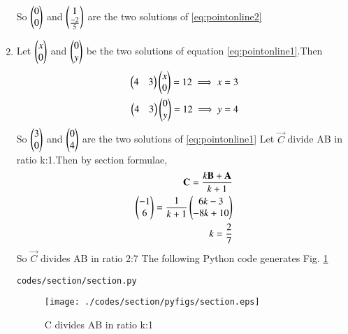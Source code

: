 \begin{enumerate}[label=\thesection.\arabic*.,ref=\thesection.\theenumi]
So $\begin{pmatrix}0\\0\end{pmatrix}$ and $\begin{pmatrix}1\\\frac{-2}{5}\end{pmatrix}$ are the two solutions of \ref{eq:pointonline2}
\item 
Let $\begin{pmatrix}x\\0\end{pmatrix}$ and $\begin{pmatrix}0\\y\end{pmatrix}$ be the two solutions of equation \ref{eq:pointonline1}.Then
\begin{align}
 \begin{pmatrix}4&3\end{pmatrix}\begin{pmatrix}x\\0\end{pmatrix}=12
 \implies x=3
 \\
 \begin{pmatrix}4&3\end{pmatrix}\begin{pmatrix}0\\y\end{pmatrix}=12
 \implies y=4
\end{align}
So $\begin{pmatrix}3\\0\end{pmatrix}$ and $\begin{pmatrix}0\\4\end{pmatrix}$ are the two solutions of \ref{eq:pointonline1}
Let $\vec{C}$ divide AB in ratio k:1.Then by section formulae,
\begin{align}
\mathbf{C}=\frac{k\mathbf{B}+\mathbf{A}}{k+1}
\\
\begin{pmatrix}-1\\6\end{pmatrix}=\frac{1}{k+1}\begin{pmatrix}6k-3\\-8k+10\end{pmatrix}
\\
k=\frac{2}{7}
\end{align}
So $\vec{C}$ divides AB in ratio 2:7
\newline
The following Python code generates Fig. \ref{fig:section}
%
\begin{lstlisting}
codes/section/section.py
\end{lstlisting}
\begin{figure}[!ht]
\centering
\texttt{[image: ./codes/section/pyfigs/section.eps]}
\caption{C divides AB in ratio k:1}
\label{fig:section}
\end{figure}
\end{enumerate}
